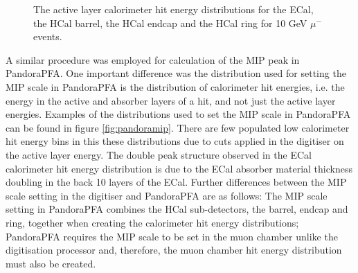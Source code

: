 \begin{figure}[h!]
\caption[The active layer calorimeter hit energy distributions for \protect{} the ECal, \protect{} the HCal barrel, \protect{} the HCal endcap and \protect{} the HCal ring for 10 GeV $\mu^{-}$ events.]{The active layer calorimeter hit energy distributions for \protect{} the ECal, \protect{} the HCal barrel, \protect{} the HCal endcap and \protect{} the HCal ring for 10 GeV $\mu^{-}$ events.}
\label{fig:digitisermip}
\end{figure}

A similar procedure was employed for calculation of the MIP peak in PandoraPFA.  One important difference was the distribution used for setting the MIP scale in PandoraPFA is the distribution of calorimeter hit energies, i.e. the energy in the active and absorber layers of a hit, and not just the active layer energies.  Examples of the distributions used to set the MIP scale in PandoraPFA can be found in figure \ref{fig:pandoramip}.  There are few populated low calorimeter hit energy bins in this these distributions due to cuts applied in the digitiser on the active layer energy.  The double peak structure observed in the ECal calorimeter hit energy distribution is due to the ECal absorber material thickness doubling in the back 10 layers of the ECal.  Further differences between the MIP scale setting in the digitiser and PandoraPFA are as follows: The MIP scale setting in PandoraPFA combines the HCal sub-detectors, the barrel, endcap and ring, together when creating the calorimeter hit energy distributions; PandoraPFA requires the MIP scale to be set in the muon chamber unlike the digitisation processor and, therefore, the muon chamber hit energy distribution must also be created.  


